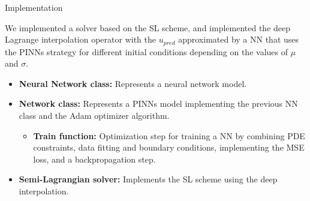 \begin{frame}{Implementation}

    We implemented a solver based on the SL scheme, and implemented the deep Lagrange interpolation operator with the $u_{pred}$ approximated by a  NN  that uses the  PINNs  strategy 
    for  different  initial  conditions depending on the values of $\mu$ and $\sigma$.
    
    \vspace{0.3cm}

    \begin{itemize}
        \item \textbf{Neural Network class:} Represents a neural network model.
        \item \textbf{Network class:} Represents a PINNs model implementing the previous NN class and the Adam optimizer algorithm.
        \begin{itemize}
            \item \textbf{Train function:} Optimization step for training a NN by combining  PDE  constraints, data  fitting and boundary conditions, implementing the MSE loss, and a backpropagation step. 
        \end{itemize}  
        \item \textbf{Semi-Lagrangian solver:} Implements the SL scheme using the deep interpolation.  

    \end{itemize}
   
     
\end{frame}
